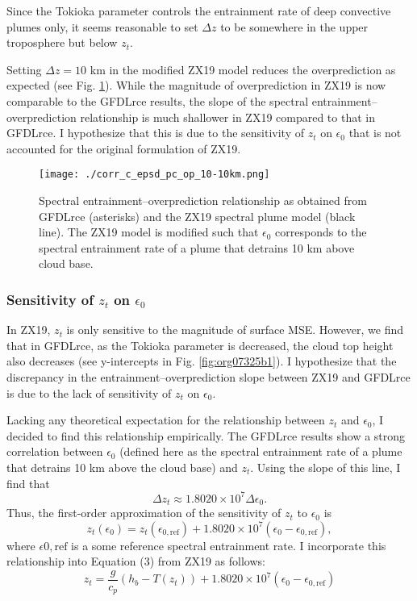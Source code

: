 \documentclass[11pt]{article}
\begin{document}
Since the Tokioka parameter controls the entrainment rate of deep convective plumes only, it seems reasonable to set \(\Delta z\) to be somewhere in the upper troposphere but below \(z_t\).

Setting \(\Delta z = 10\) km in the modified ZX19 model reduces the overprediction as expected (see Fig. \ref{fig:org08e9671}). While the magnitude of overprediction in ZX19 is now comparable to the GFDLrce results, the slope of the spectral entrainment--overprediction relationship is much shallower in ZX19 compared to that in GFDLrce. I hypothesize that this is due to the sensitivity of \(z_t\) on \(\epsilon_0\) that is not accounted for the original formulation of ZX19.

\begin{figure}[htbp]
\centering
\texttt{[image: ./corr\_c\_epsd\_pc\_op\_10-10km.png]}
\caption{\label{fig:org08e9671}Spectral entrainment--overprediction relationship as obtained from GFDLrce (asterisks) and the ZX19 spectral plume model (black line). The ZX19 model is modified such that \(\epsilon_0\) corresponds to the spectral entrainment rate of a plume that detrains 10 km above cloud base.}
\end{figure}

\subsubsection*{Sensitivity of \(z_t\) on \(\epsilon_0\)}
\label{sec:org52a8193}
In ZX19, \(z_t\) is only sensitive to the magnitude of surface MSE. However, we find that in GFDLrce, as the Tokioka parameter is decreased, the cloud top height also decreases (see y-intercepts in Fig. \ref{fig:org07325b1}). I hypothesize that the discrepancy in the entrainment--overprediction slope between ZX19 and GFDLrce is due to the lack of sensitivity of \(z_t\) on \(\epsilon_0\).

Lacking any theoretical expectation for the relationship between \(z_t\) and \(\epsilon_0\), I decided to find this relationship empirically. The GFDLrce results show a strong correlation between \(\epsilon_0\) (defined here as the spectral entrainment rate of a plume that detrains 10 km above the cloud base) and \(z_t\). Using the slope of this line, I find that
\begin{equation}
\Delta z_t \approx 1.8020\times 10^7 \Delta\epsilon_0.
\end{equation}
Thus, the first-order approximation of the sensitivity of \(z_t\) to \(\epsilon_0\) is
\begin{equation}
z_t(\epsilon_0) = z_t(\epsilon_{0,\mathrm{ref}}) + 1.8020\times 10^7(\epsilon_0-\epsilon_{0,\mathrm{ref}}),
\end{equation}
where \(\epsilon{0,\mathrm{ref}}\) is a some reference spectral entrainment rate. I incorporate this relationship into Equation (3) from ZX19 as follows:
\begin{equation}
z_t = \frac{g}{c_p}(h_b - T(z_t)) + 1.8020\times 10^7(\epsilon_0-\epsilon_{0,\mathrm{ref}})
\end{equation}
\end{document}
